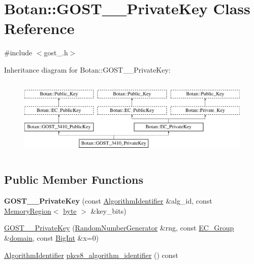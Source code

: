\hypertarget{classBotan_1_1GOST__3410__PrivateKey}{\section{Botan\-:\-:G\-O\-S\-T\-\_\-\_\-\-Private\-Key Class Reference}
\label{classBotan_1_1GOST__3410__PrivateKey}
}


{\ttfamily \#include $<$gost\-\_.\-h$>$}

Inheritance diagram for Botan\-:\-:G\-O\-S\-T\-\_\-\_\-\-Private\-Key\-:\begin{figure}[H]
\begin{center}
\leavevmode
\includegraphics[height=3.809524cm]{classBotan_1_1GOST__3410__PrivateKey}
\end{center}
\end{figure}
\subsection*{Public Member Functions}
\begin{DoxyCompactItemize}
\item 
\hypertarget{classBotan_1_1GOST__3410__PrivateKey_aa6441a52056bf424b153fd07ce5b5c30}{{\bfseries G\-O\-S\-T\-\_\-\_\-\-Private\-Key} (const \hyperlink{classBotan_1_1AlgorithmIdentifier}{Algorithm\-Identifier} \&alg\-\_\-id, const \hyperlink{classBotan_1_1MemoryRegion}{Memory\-Region}$<$ \hyperlink{namespaceBotan_a7d793989d801281df48c6b19616b8b84}{byte} $>$ \&key\-\_\-bits)}\label{classBotan_1_1GOST__3410__PrivateKey_aa6441a52056bf424b153fd07ce5b5c30}

\item 
\hyperlink{classBotan_1_1GOST__3410__PrivateKey_a9971cbba27b0b9e1bc746f44c02b9d10}{G\-O\-S\-T\-\_\-\_\-\-Private\-Key} (\hyperlink{classBotan_1_1RandomNumberGenerator}{Random\-Number\-Generator} \&rng, const \hyperlink{classBotan_1_1EC__Group}{E\-C\-\_\-\-Group} \&\hyperlink{classBotan_1_1EC__PublicKey_a5fe61411ec55d30d9cf0c36116223a71}{domain}, const \hyperlink{classBotan_1_1BigInt}{Big\-Int} \&x=0)
\item 
\hyperlink{classBotan_1_1AlgorithmIdentifier}{Algorithm\-Identifier} \hyperlink{classBotan_1_1GOST__3410__PrivateKey_a2dfba25443742946a9ee843eb680c4b5}{pkcs8\-\_\-algorithm\-\_\-identifier} () const 
\end{DoxyCompactItemize}
